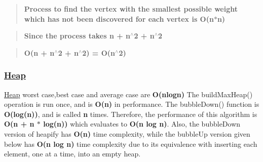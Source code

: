 \begin{quote}
{\bfseries Process to find the vertex with the smallest possible weight which has not been discovered for each vertex is O(n$\ast$n)} \end{quote}


\begin{quote}
{\bfseries Since the process takes n + n$^\wedge$2 + n$^\wedge$2} \end{quote}


\begin{quote}
{\bfseries O(n + n$^\wedge$2 + n$^\wedge$2) = O(n$^\wedge$2)} \end{quote}


\subsubsection*{\hyperlink{class_heap}{Heap}}

\hyperlink{class_heap}{Heap} worst case,best case and average case are {\bfseries O(nlogn)} The build\+Max\+Heap() operation is run once, and is {\bfseries O(n)} in performance. The bubble\+Down() function is {\bfseries O(log(n))}, and is called {\bfseries n} times. Therefore, the performance of this algorithm is {\bfseries O(n + n $\ast$ log(n))} which evaluates to {\bfseries O(n log n)}. Also, the bubble\+Down version of heapify has {\bfseries O(n)} time complexity, while the bubble\+Up version given below has {\bfseries O(n log n)} time complexity due to its equivalence with inserting each element, one at a time, into an empty heap. 